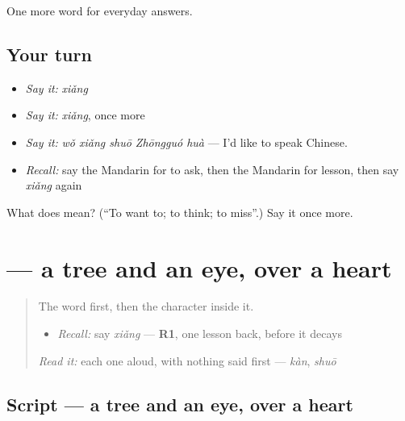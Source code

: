 \begin{grammarlens}[title={What you've built}]
One more word for everyday answers.
\end{grammarlens}

\subsection*{Your turn}
\begin{itemize}
\raggedright
  \item \emph{Say it:} \emph{xiǎng}
  \item \emph{Say it:} \emph{xiǎng}, once more
  \item \emph{Say it:} \emph{wǒ xiǎng shuō Zhōngguó huà} — I'd like to speak Chinese.
  \item \emph{Recall:} say the Mandarin for to ask, then the Mandarin for lesson, then say \emph{xiǎng} again
\end{itemize}

\begin{tcolorbox}[breakable,colback=teal!4,colframe=teal!35!black,title={Before you move on}]
What does  mean? (\textquotedblleft{}To want to; to think; to miss\textquotedblright{}.) Say it once more.
\end{tcolorbox}
\section[\texorpdfstring{\zh{想} (xiǎng)}{想 (xiǎng)}]{ — a tree and an eye, over a heart}

\label{lesson:ZH-W55-xiang}



\begin{quote}
The word first, then the character inside it.

\begin{itemize}
\raggedright
  \item \emph{Recall:} say \emph{xiǎng} — \textbf{R1}, one lesson back, before it decays
\end{itemize}

\begin{quote}
 
\end{quote}

\emph{Read it:} each one aloud, with nothing said first — \emph{kàn}, \emph{shuō}
\end{quote}

\subsection*{Script — a tree and an eye, over a heart}

